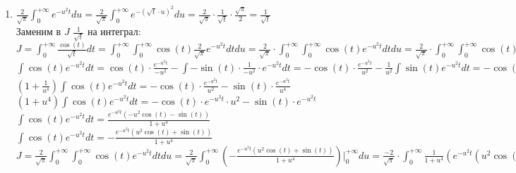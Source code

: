 \begin{enumerate}
    \item $\displaystyle \frac{2}{\sqrt{\pi}} \int_0^{+\infty} e^{-u^2t} du =
        \frac{2}{\sqrt{\pi}} \int_0^{+\infty} e^{-(\sqrt{t} \cdot u)^2} du =
        \frac{2}{\sqrt{\pi}} \cdot \frac{1}{\sqrt{t}} \cdot \frac{\sqrt{\pi}}{2} =
        \frac{1}{\sqrt{t}}$ \\
        Заменим в $J$ $\frac{1}{\sqrt{t}}$ на интеграл: \\
        $\displaystyle J = \int_0^{+\infty} \frac{\cos(t)}{\sqrt{t}} dt =
            \int_0^{+\infty} \int_0^{+\infty} \cos(t) \frac{2}{\sqrt{\pi}} e^{-u^2t} dtdu =
            \frac{2}{\sqrt{\pi}} \cdot \int_0^{+\infty} \int_0^{+\infty} \cos(t) e^{-u^2t} dtdu =
            \frac{2}{\sqrt{\pi}} \cdot \int_0^{+\infty} \int_0^{+\infty} \cos(t) e^{-u^2t} dtdu $ \\
        $\int \cos(t) e^{-u^2t} dt = 
            \cos(t) \cdot \frac{e^{-u^2t}}{-u^2} - \int -\sin(t) \cdot \frac{1}{-u^2} \cdot e^{-u^2t} dt = 
            -\cos(t) \cdot \frac{e^{-u^2t}}{u^2} - \frac{1}{u^2} \int \sin(t) e^{-u^2t} dt = 
            -\cos(t) \cdot \frac{e^{-u^2t}}{u^2} - \frac{1}{u^2} (\sin(t) \cdot \frac{e^{-u^2t}}{u^2} - \int \cos(t) \cdot \frac{1}{-u^2} \cdot e^{-u^2t} dt) = 
            -\cos(t) \cdot \frac{e^{-u^2t}}{u^2} - \frac{1}{u^2} (\sin(t) \cdot \frac{e^{-u^2t}}{u^2} + \frac{1}{u^2} \int \cos(t) e^{-u^2t} dt) = 
            -\cos(t) \cdot \frac{e^{-u^2t}}{u^2} - \sin(t) \cdot \frac{e^{-u^2t}}{u^4} - \frac{1}{u^4} \int \cos(t) e^{-u^2t} dt) = 
        $ \\
        $\displaystyle (1 + \frac{1}{u^4}) \int \cos(t) e^{-u^2t} dt = -\cos(t) \cdot \frac{e^{-u^2t}}{u^2} - \sin(t) \cdot \frac{e^{-u^2t}}{u^4}$ \\
        $\displaystyle (1 + u^4) \int \cos(t) e^{-u^2t} dt = -\cos(t) \cdot e^{-u^2t} \cdot u^2 - \sin(t) \cdot e^{-u^2t}$ \\
        $\displaystyle \int \cos(t) e^{-u^2t} dt = \frac{e^{-u^2t}(-u^2\cos(t) - \sin(t))}{1 + u^4}$ \\
        $\displaystyle \int \cos(t) e^{-u^2t} dt = -\frac{e^{-u^2t}(u^2\cos(t) + \sin(t))}{1 + u^4}$ \\
        $\displaystyle J = \frac{2}{\sqrt{\pi}} \int_0^{+\infty} \int_0^{+\infty} \cos(t) e^{-u^2t} dtdu =
            \frac{2}{\sqrt{\pi}} \int_0^{+\infty} (-\frac{e^{-u^2t}(u^2\cos(t) + \sin(t))}{1 + u^4})\Big|_0^{+\infty} du =
            \frac{-2}{\sqrt{\pi}} \cdot \int_0^{+\infty} \frac{1}{1 + u^4} (e^{-u^2t}(u^2\cos(t) + \sin(t)))\Big|_0^{+\infty} du $ \\

\end{enumerate}
